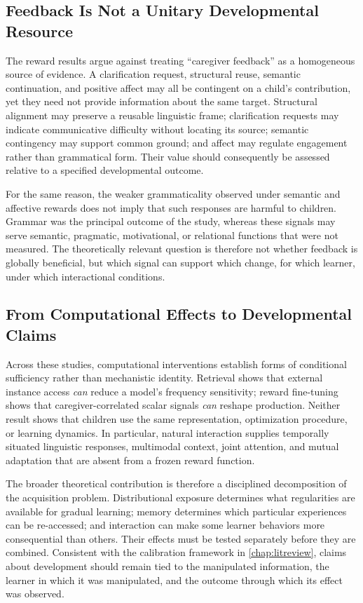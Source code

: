 \subsection{Feedback Is Not a Unitary Developmental Resource}

The reward results argue against treating ``caregiver feedback'' as a homogeneous source of evidence. A clarification request, structural reuse, semantic continuation, and positive affect may all be contingent on a child's contribution, yet they need not provide information about the same target. Structural alignment may preserve a reusable linguistic frame; clarification requests may indicate communicative difficulty without locating its source; semantic contingency may support common ground; and affect may regulate engagement rather than grammatical form. Their value should consequently be assessed relative to a specified developmental outcome.

For the same reason, the weaker grammaticality observed under semantic and affective rewards does not imply that such responses are harmful to children. Grammar was the principal outcome of the study, whereas these signals may serve semantic, pragmatic, motivational, or relational functions that were not measured. The theoretically relevant question is therefore not whether feedback is globally beneficial, but which signal can support which change, for which learner, under which interactional conditions.

\subsection{From Computational Effects to Developmental Claims}

Across these studies, computational interventions establish forms of conditional sufficiency rather than mechanistic identity. Retrieval shows that external instance access \emph{can} reduce a model's frequency sensitivity; reward fine-tuning shows that caregiver-correlated scalar signals \emph{can} reshape production. Neither result shows that children use the same representation, optimization procedure, or learning dynamics. In particular, natural interaction supplies temporally situated linguistic responses, multimodal context, joint attention, and mutual adaptation that are absent from a frozen reward function.

The broader theoretical contribution is therefore a disciplined decomposition of the acquisition problem. Distributional exposure determines what regularities are available for gradual learning; memory determines which particular experiences can be re-accessed; and interaction can make some learner behaviors more consequential than others. Their effects must be tested separately before they are combined. Consistent with the calibration framework in \cref{chap:litreview}, claims about development should remain tied to the manipulated information, the learner in which it was manipulated, and the outcome through which its effect was observed.

